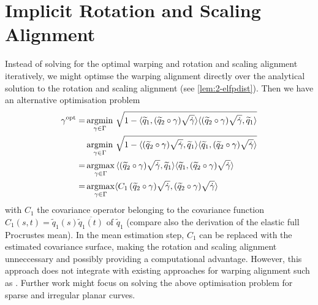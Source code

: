 \section{Implicit Rotation and Scaling Alignment}
\label{app:a-warp}
Instead of solving for the optimal warping and rotation and scaling alignment iteratively, we might optimse the warping alignment directly over the analytical solution to the rotation and scaling alignment (see \cref{lem:2-elfpdist}).
Then we have an alternative optimisation problem
\begin{align*}
  \gamma^\mathrm{opt} = & \operatorname*{argmin}_{\gamma \in \Gamma}\, \sqrt{1 - \langle \widetilde q_1, (\widetilde q_2  \circ \gamma ) \sqrt{\dot\gamma} \rangle \langle (\widetilde q_2 \circ \gamma) \sqrt{\dot\gamma}, \widetilde q_1 \rangle } \\
    & \operatorname*{argmin}_{\gamma \in \Gamma} \, \sqrt{1 - \langle (\widetilde q_2  \circ \gamma ) \sqrt{\dot\gamma}, \widetilde q_1 \rangle \langle \widetilde q_1, (\widetilde q_2 \circ \gamma) \sqrt{\dot\gamma} \rangle } \\
    = & \operatorname*{argmax}_{\gamma \in \Gamma} \, \langle (\widetilde q_2  \circ \gamma ) \sqrt{\dot\gamma}, \widetilde q_1 \rangle \langle \widetilde q_1, (\widetilde q_2 \circ \gamma) \sqrt{\dot\gamma} \rangle \\
    = & \operatorname*{argmax}_{\gamma \in \Gamma} \langle C_1 \, (\widetilde q_2 \circ \gamma ) \sqrt{\dot \gamma}, (\widetilde q_2 \circ \gamma)\sqrt{\dot\gamma} \rangle
\end{align*}
with $C_1$ the covariance operator belonging to the covariance function $C_1(s,t) = \widetilde q_1(s) \overline{\widetilde q_1 (t)}$ of $\widetilde q_1$ (compare also the derivation of the elastic full Procrustes mean).
In the mean estimation step, $C_1$ can be replaced with the estimated covariance surface, making the rotation and scaling alignment unneccessary and possibly providing a computational advantage.
However, this approach does not integrate with existing approaches for warping alignment such as \cite{Steyer2021}.
Further work might focus on solving the above optimisation problem for sparse and irregular planar curves.

